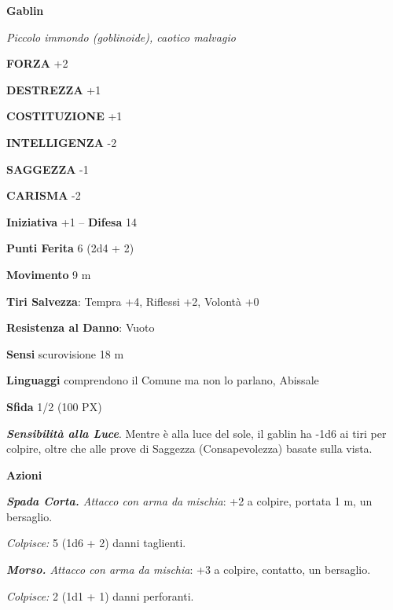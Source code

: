 \begin{multicols}{2}
\medskip{}\textbf{Gablin}

\textit{Piccolo immondo (goblinoide), caotico malvagio}

\textbf{FORZA} +2

\textbf{DESTREZZA} +1

\textbf{COSTITUZIONE} +1

\textbf{INTELLIGENZA} -2

\textbf{SAGGEZZA} -1

\textbf{CARISMA} -2

\textbf{Iniziativa} +1 -- \textbf{Difesa} 14

\textbf{Punti Ferita} 6 (2d4 + 2)

\textbf{Movimento} 9 m

\textbf{Tiri Salvezza}: Tempra +4, Riflessi +2, Volontà +0

\textbf{Resistenza al Danno}: Vuoto

\textbf{Sensi} scurovisione 18 m

\textbf{Linguaggi} comprendono il Comune ma non lo parlano, Abissale

\textbf{Sfida} 1/2 (100 PX)

\textit{\textbf{Sensibilità alla Luce}}. Mentre è alla luce del sole, il gablin  ha -1d6 ai tiri per colpire, oltre che alle prove di Saggezza (Consapevolezza) basate sulla vista.

\textbf{Azioni}

\textit{\textbf{Spada Corta.} Attacco con arma da mischia}: +2 a colpire, portata 1 m, un bersaglio.

\textit{Colpisce:} 5 (1d6 + 2) danni taglienti.

\textit{\textbf{Morso.} Attacco con arma da mischia}: +3 a colpire, contatto, un bersaglio.

\textit{Colpisce:} 2 (1d1 + 1) danni perforanti.


\end{multicols}
